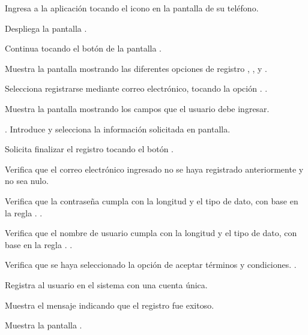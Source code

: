 	\begin{UCtrayectoria}
		\UCpaso [\UCactor] Ingresa a la aplicación tocando el icono  en la pantalla de su teléfono.
		
		\UCpaso Despliega la pantalla  .
		
		\UCpaso [\UCactor] Continua tocando el  botón  de la pantalla .
		
		\UCpaso Muestra la pantalla  mostrando las diferentes opciones de registro , ,  y .
		
		\UCpaso [\UCactor] Selecciona registrarse mediante correo electrónico, tocando la opción .  .
		
		\UCpaso Muestra la pantalla  mostrando los campos que el usuario debe ingresar.
		
		\UCpaso [\UCactor] \label{RE-CU1:IntroduceInformacion}. Introduce y selecciona la información solicitada en pantalla.
		
		\UCpaso [\UCactor] Solicita finalizar el registro tocando el botón .
		
		\UCpaso Verifica que el correo electrónico ingresado no se haya registrado anteriormente y no sea nulo.  
		
		\UCpaso Verifica que la contraseña cumpla con la longitud y el tipo de dato, con base en la regla .  .
			
		\UCpaso Verifica que el nombre de usuario cumpla con la longitud y el tipo de dato, con base en la regla .  .
		
		\UCpaso Verifica que se haya seleccionado la opción de aceptar términos y condiciones.  .
		
		\UCpaso Registra al usuario en el sistema con una cuenta única. 
		
		\UCpaso Muestra el mensaje  indicando que el registro fue exitoso.
		
		\UCpaso \label{RE-CU1:Pantalla}Muestra la pantalla .
		
	\end{UCtrayectoria}

